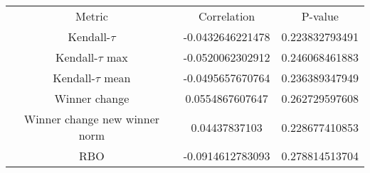 \begin{tabular}{c|c|c}
Metric & Correlation & P-value \\ 
Kendall-$\tau$ & -0.0432646221478 & 0.223832793491 \\ 
Kendall-$\tau$ max & -0.0520062302912 & 0.246068461883 \\ 
Kendall-$\tau$ mean & -0.0495657670764 & 0.236389347949 \\ 
Winner change & 0.0554867607647 & 0.262729597608 \\ 
Winner change new winner norm & 0.04437837103 & 0.228677410853 \\ 
RBO & -0.0914612783093 & 0.278814513704 \\ 
\end{tabular}
